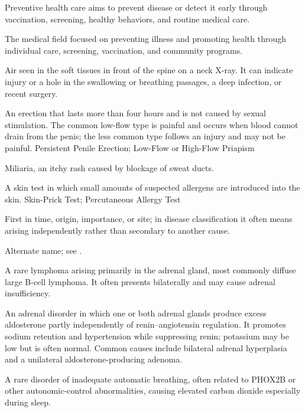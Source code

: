  Preventive health care aims to prevent disease or detect it early through vaccination, screening, healthy behaviors, and routine medical care.

 The medical field focused on preventing illness and promoting health through individual care, screening, vaccination, and community programs.

 Air seen in the soft tissues in front of the spine on a neck X-ray. It can indicate injury or a hole in the swallowing or breathing passages, a deep infection, or recent surgery.

 An erection that lasts more than four hours and is not caused by sexual stimulation. The common low-flow type is painful and occurs when blood cannot drain from the penis; the less common type follows an injury and may not be painful.
\synonyms
Persistent Penile Erection; Low-Flow or High-Flow Priapism

 Miliaria, an itchy rash caused by blockage of sweat ducts.

 A skin test in which small amounts of suspected allergens are introduced into the skin.
\synonyms
Skin-Prick Test; Percutaneous Allergy Test

 First in time, origin, importance, or site; in disease classification it often means arising independently rather than secondary to another cause.

 Alternate name; see .

 A rare lymphoma arising primarily in the adrenal gland, most commonly diffuse large
B-cell lymphoma. It often presents bilaterally and may cause adrenal insufficiency.

 An adrenal disorder in which one or both adrenal glands produce excess aldosterone partly independently of renin–angiotensin regulation. It promotes sodium retention and hypertension while suppressing renin; potassium may be low but is often normal. Common causes include bilateral adrenal hyperplasia and a unilateral aldosterone-producing adenoma.

 A rare disorder of inadequate automatic breathing, often related to PHOX2B or other autonomic-control abnormalities, causing elevated carbon dioxide especially during sleep.

